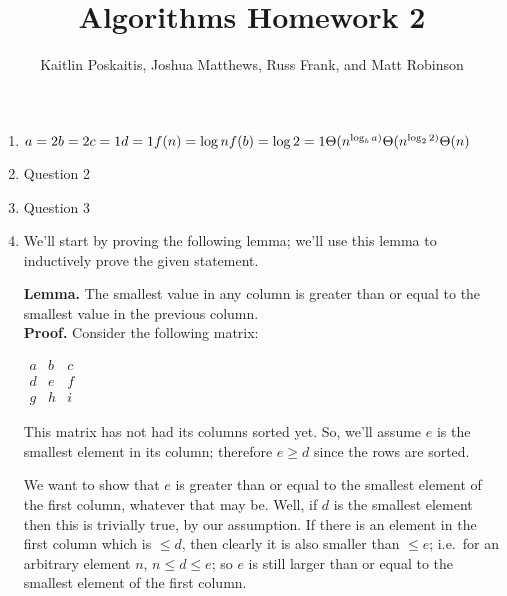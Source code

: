 \documentclass[12pt]{article}
\title{\bf Algorithms Homework 2}
\author{Kaitlin Poskaitis, Joshua Matthews, Russ Frank, and Matt Robinson}
\date{}
\begin{document}
\maketitle

\begin{enumerate}

\item

  $a = 2\\
  b = 2\\
  c = 1\\
  d = 1\\
  f(n) = \log n\\
  f(b) = \log 2 = 1\\
  \Theta (n^{\log_b a)}\\
  \Theta (n^{\log_2 2)}\\
  \Theta (n)\\$

\item Question 2

\item Question 3

\item 

  We'll start by proving the following lemma; we'll use this lemma to
  inductively prove the given statement.

  \textbf{Lemma.} The smallest value in any column is greater than or equal to
  the smallest value in the previous column.\\
  \textbf{Proof.} Consider the following matrix:

  $\begin{matrix}
    a & b & c \\
    d & e & f \\
    g & h & i
  \end{matrix}$

  This matrix has not had its columns sorted yet. So, we'll assume $e$ is the
  smallest element in its column; therefore $e \ge d$ since the rows are sorted.

  We want to show that $e$ is greater than or equal to the smallest element of the first
  column, whatever that may be. Well, if $d$ is the smallest element then this
  is trivially true, by our assumption. If there is an element in the first
  column which is $\le d$, then clearly it is also smaller than $\le e$;
  i.e.\ for an arbitrary element $n$, $n \le d \le e$; so $e$ is still larger 
  than or equal to the smallest element of the first column.


\end{enumerate}
\end{document}
